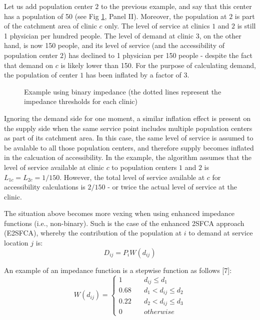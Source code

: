 \documentclass[10pt,letterpaper]{article}
\begin{document}
Let us add population center \(2\) to the previous example, and say that
this center has a population of 50 (see Fig \ref{fig:fig1-example-1},
Panel II). Moreover, the population at \(2\) is part of the catchment
area of clinic \(c\) only. The level of service at clinics \(1\) and
\(2\) is still 1 physician per hundred people. The level of demand at
clinic \(3\), on the other hand, is now 150 people, and its level of
service (and the accessibility of population center \(2\)) has declined
to 1 physician per 150 people - despite the fact that demand on \(c\) is
likely lower than 150. For the purpose of calculating demand, the
population of center \(1\) has been inflated by a factor of 3.

\begin{figure}[htbp]
\centering
\caption{\label{fig:fig1-example-1}Example using binary impedance (the
dotted lines represent the impedance thresholds for each clinic)}
\end{figure}

Ignoring the demand side for one moment, a similar inflation effect is
present on the supply side when the same service point includes multiple
population centers as part of its catchment area. In this case, the same
level of service is assumed to be avalable to all those population
centers, and therefore supply becomes inflated in the calcuation of
accessibility. In the example, the algorithm assumes that the level of
service available at clinic \(c\) to population centers \(1\) and \(2\)
is \(L_{1c}=L_{2c}=1/150\). However, the total level of service
available at \(c\) for accessibility calculations is \(2/150\) - or
twice the actual level of service at the clinic.

The situation above becomes more vexing when using enhanced impedance
functions (i.e., non-binary). Such is the case of the enhanced 2SFCA
approach (E2SFCA), whereby the contribution of the population at \(i\)
to demand at service location \(j\) is: \[
D_{ij} = P_iW(d_{ij})
\]

An example of an impedance function is a stepwise function as follows
{[}7{]}: \[
W(d_{ij}) = \left\{
        \begin{array}{ll}
            1 & \quad d_{ij} \leq d_1 \\
            0.68 & \quad d_1 < d_{ij} \leq d_2 \\
            0.22 & \quad d_2 < d_{ij} \leq d_3 \\
            0 & \quad otherwise
        \end{array}
    \right.
\]
\end{document}

